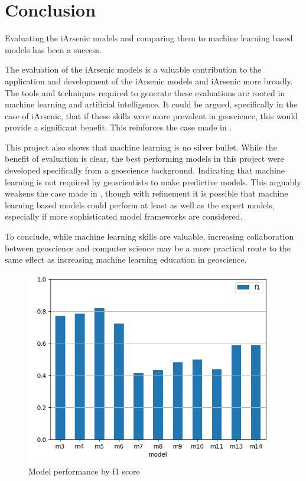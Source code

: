 \section{Conclusion}

Evaluating the iArsenic models and comparing them to machine learning based models has been a success.

The evaluation of the iArsenic models is a valuable contribution to the application and development of the iArsenic models and iArsenic more broadly. The tools and techniques required to generate these evaluations are rooted in machine learning and artificial intelligence. It could be argued, specifically in the case of iArsenic, that if these skills were more prevalent in geoscience, this would provide a significant benefit. This reinforces the case made in \cite{Fleming2021}.

This project also shows that machine learning is no silver bullet. While the benefit of evaluation is clear, the best performing models in this project were developed specifically from a geoscience background. Indicating that machine learning is not required by geoscientists to make predictive models. This arguably weakens the case made in \cite{Fleming2021}, though with refinement it is possible that machine learning based models could perform at least as well as the expert models, especially if more sophisticated model frameworks are considered.

To conclude, while machine learning skills are valuable, increasing collaboration between geoscience and computer science may be a more practical route to the same effect as increasing machine learning education in geoscience.

\begin{figure}[h]
    \centering
    \includegraphics[scale=0.6]{figures/model_f1_barchart.png} 
    \caption{Model performance by f1 score}
    \label{fig:x mpf1}
\end{figure}


